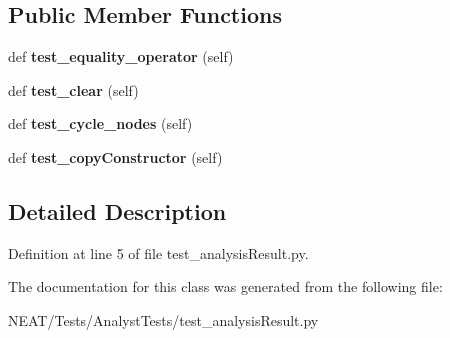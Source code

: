 \subsection*{Public Member Functions}
\begin{DoxyCompactItemize}
\item 
def {\bfseries test\+\_\+equality\+\_\+operator} (self)\hypertarget{class_n_e_a_t___py_genetics_1_1_n_e_a_t_1_1_tests_1_1_analyst_tests_1_1test__analysis_result_1_1_test_analysis_result_ac7be3b7805195cdf50e994684a89e9a6}{}\label{class_n_e_a_t___py_genetics_1_1_n_e_a_t_1_1_tests_1_1_analyst_tests_1_1test__analysis_result_1_1_test_analysis_result_ac7be3b7805195cdf50e994684a89e9a6}

\item 
def {\bfseries test\+\_\+clear} (self)\hypertarget{class_n_e_a_t___py_genetics_1_1_n_e_a_t_1_1_tests_1_1_analyst_tests_1_1test__analysis_result_1_1_test_analysis_result_a936ce5fd67dd44d516a1cb5c9d3fe282}{}\label{class_n_e_a_t___py_genetics_1_1_n_e_a_t_1_1_tests_1_1_analyst_tests_1_1test__analysis_result_1_1_test_analysis_result_a936ce5fd67dd44d516a1cb5c9d3fe282}

\item 
def {\bfseries test\+\_\+cycle\+\_\+nodes} (self)\hypertarget{class_n_e_a_t___py_genetics_1_1_n_e_a_t_1_1_tests_1_1_analyst_tests_1_1test__analysis_result_1_1_test_analysis_result_a53fa99c33443988b4d9ec4bc99f6c252}{}\label{class_n_e_a_t___py_genetics_1_1_n_e_a_t_1_1_tests_1_1_analyst_tests_1_1test__analysis_result_1_1_test_analysis_result_a53fa99c33443988b4d9ec4bc99f6c252}

\item 
def {\bfseries test\+\_\+copy\+Constructor} (self)\hypertarget{class_n_e_a_t___py_genetics_1_1_n_e_a_t_1_1_tests_1_1_analyst_tests_1_1test__analysis_result_1_1_test_analysis_result_a8f560a4866c15837720dcf43ba95c725}{}\label{class_n_e_a_t___py_genetics_1_1_n_e_a_t_1_1_tests_1_1_analyst_tests_1_1test__analysis_result_1_1_test_analysis_result_a8f560a4866c15837720dcf43ba95c725}

\end{DoxyCompactItemize}


\subsection{Detailed Description}


Definition at line 5 of file test\+\_\+analysis\+Result.\+py.



The documentation for this class was generated from the following file\+:\begin{DoxyCompactItemize}
\item 
N\+E\+A\+T/\+Tests/\+Analyst\+Tests/test\+\_\+analysis\+Result.\+py\end{DoxyCompactItemize}
